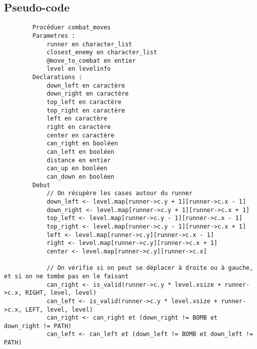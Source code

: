 \subsection{Pseudo-code}

\begin{longlisting}
    \begin{verbatim}
        Procéduer combat_moves
        Parametres :
            runner en character_list
            closest_enemy en character_list
            @move_to_combat en entier 
            level en levelinfo
        Declarations :
            down_left en caractère
            down_right en caractère
            top_left en caractère
            top_right en caractère
            left en caractère
            right en caractère
            center en caractère
            can_right en booléen
            can_left en booléen
            distance en entier
            can_up en booléen
            can_down en booléen
        Debut
            // On récupère les cases autour du runner
            down_left <- level.map[runner->c.y + 1][runner->c.x - 1]
            down_right <- level.map[runner->c.y + 1][runner->c.x + 1]
            top_left <- level.map[runner->c.y - 1][runner->c.x - 1]
            top_right <- level.map[runner->c.y - 1][runner->c.x + 1]
            left <- level.map[runner->c.y][runner->c.x - 1]
            right <- level.map[runner->c.y][runner->c.x + 1]
            center <- level.map[runner->c.y][runner->c.x]

            // On vérifie si on peut se déplacer à droite ou à gauche, et si on ne tombe pas en le faisant
            can_right <- is_valid(runner->c.y * level.xsize + runner->c.x, RIGHT, level, level)
            can_left <- is_valid(runner->c.y * level.xsize + runner->c.x, LEFT, level, level)
            can_right <- can_right et (down_right != BOMB et down_right != PATH)
            can_left <- can_left et (down_left != BOMB et down_left != PATH)


\end{verbatim}
\end{longlisting}
